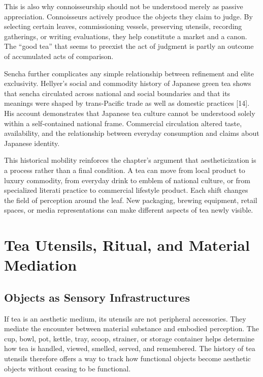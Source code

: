 \documentclass[11pt,a4paper]{article}
\begin{document}
This is also why connoisseurship should not be understood merely as passive appreciation. Connoisseurs actively produce the objects they claim to judge. By selecting certain leaves, commissioning vessels, preserving utensils, recording gatherings, or writing evaluations, they help constitute a market and a canon. The ``good tea'' that seems to preexist the act of judgment is partly an outcome of accumulated acts of comparison.

Sencha further complicates any simple relationship between refinement and elite exclusivity. Hellyer's social and commodity history of Japanese green tea shows that sencha circulated across national and social boundaries and that its meanings were shaped by trans-Pacific trade as well as domestic practices [14]. His account demonstrates that Japanese tea culture cannot be understood solely within a self-contained national frame. Commercial circulation altered taste, availability, and the relationship between everyday consumption and claims about Japanese identity.

This historical mobility reinforces the chapter's argument that aestheticization is a process rather than a final condition. A tea can move from local product to luxury commodity, from everyday drink to emblem of national culture, or from specialized literati practice to commercial lifestyle product. Each shift changes the field of perception around the leaf. New packaging, brewing equipment, retail spaces, or media representations can make different aspects of tea newly visible.

\section{Tea Utensils, Ritual, and Material Mediation}

\subsection{Objects as Sensory Infrastructures}

If tea is an aesthetic medium, its utensils are not peripheral accessories. They mediate the encounter between material substance and embodied perception. The cup, bowl, pot, kettle, tray, scoop, strainer, or storage container helps determine how tea is handled, viewed, smelled, served, and remembered. The history of tea utensils therefore offers a way to track how functional objects become aesthetic objects without ceasing to be functional.
\end{document}
